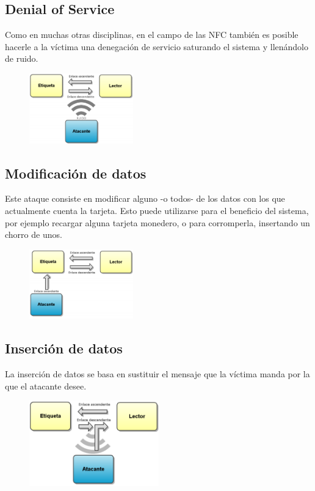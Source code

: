 \subsection{Denial of Service}
Como en muchas otras disciplinas, en el campo de las NFC también es posible hacerle a la víctima una denegación de servicio saturando el sistema y llenándolo de ruido.
\begin{figure}[!h]
	\centering
	\includegraphics[width=0.4\textwidth]{figures/dos.png}
\end{figure}
\subsection{Modificación de datos}
Este ataque consiste en modificar alguno -o todos- de los datos con los que actualmente cuenta la tarjeta. Esto puede utilizarse para el beneficio del sistema, por ejemplo recargar alguna tarjeta monedero, o para corromperla, insertando un chorro de unos.
\begin{figure}[!h]
	\centering
	\includegraphics[width=0.4\textwidth]{figures/modificacion.png}
\end{figure}
\clearpage
\subsection{Inserción de datos}
La inserción de datos se basa en sustituir el mensaje que la víctima manda por la que el atacante desee.
\begin{figure}[!h]
	\centering
	\includegraphics[width=0.5\textwidth]{figures/insercion.png}
\end{figure}
